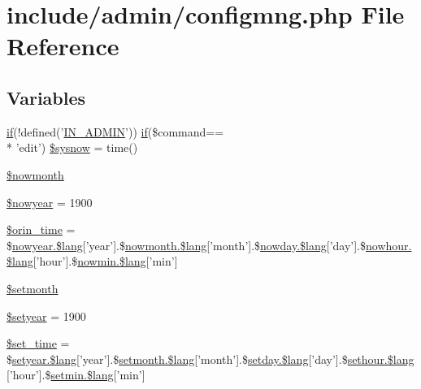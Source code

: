 \hypertarget{configmng_8php}{\section{include/admin/configmng.php File Reference}
\label{configmng_8php}
}
\subsection*{Variables}
\begin{DoxyCompactItemize}
\item 
\hyperlink{login__old_8php_a4ac1118c2e44c513a674bc1793ba6c90}{if}(!defined('\hyperlink{admin_8php_ad49472b0cdee543164375bf133a537f1}{I\+N\+\_\+\+A\+D\+M\+I\+N}')) \hyperlink{login__old_8php_a4ac1118c2e44c513a674bc1793ba6c90}{if}(\$command== \\*
'edit') \hyperlink{configmng_8php_ac8e8c76dd2f202183e4a4d51f56afbfb}{\$sysnow} = time()
\item 
\hyperlink{configmng_8php_abec251fa3431224f4ef12bbe94f3cb00}{\$nowmonth}
\item 
\hyperlink{configmng_8php_abbdd318e2a9fe9ad5799b9e6170e9c89}{\$nowyear} = 1900
\item 
\hyperlink{configmng_8php_a08b80099c663582a6f171ae6340787cd}{\$orin\+\_\+time} = \$\hyperlink{templates_2install_2traditional__chinese__utf8_8lang_8php_a7714b111b644017933931ec69a154102}{nowyear.\$lang}\mbox{[}'year'\mbox{]}.\$\hyperlink{templates_2install_2traditional__chinese__utf8_8lang_8php_a7714b111b644017933931ec69a154102}{nowmonth.\$lang}\mbox{[}'month'\mbox{]}.\$\hyperlink{templates_2install_2traditional__chinese__utf8_8lang_8php_a7714b111b644017933931ec69a154102}{nowday.\$lang}\mbox{[}'day'\mbox{]}.\$\hyperlink{templates_2install_2traditional__chinese__utf8_8lang_8php_a7714b111b644017933931ec69a154102}{nowhour.\$lang}\mbox{[}'hour'\mbox{]}.\$\hyperlink{templates_2install_2traditional__chinese__utf8_8lang_8php_a7714b111b644017933931ec69a154102}{nowmin.\$lang}\mbox{[}'min'\mbox{]}
\item 
\hyperlink{configmng_8php_ad0fe74be5fde6d338d88cd0745d972ae}{\$setmonth}
\item 
\hyperlink{configmng_8php_ae3eb1622bafce3a8595259194b7ecb8d}{\$setyear} = 1900
\item 
\hyperlink{configmng_8php_a655ccb5ffe64589a8852070d977d18b4}{\$set\+\_\+time} = \$\hyperlink{templates_2install_2traditional__chinese__utf8_8lang_8php_a7714b111b644017933931ec69a154102}{setyear.\$lang}\mbox{[}'year'\mbox{]}.\$\hyperlink{templates_2install_2traditional__chinese__utf8_8lang_8php_a7714b111b644017933931ec69a154102}{setmonth.\$lang}\mbox{[}'month'\mbox{]}.\$\hyperlink{templates_2install_2traditional__chinese__utf8_8lang_8php_a7714b111b644017933931ec69a154102}{setday.\$lang}\mbox{[}'day'\mbox{]}.\$\hyperlink{templates_2install_2traditional__chinese__utf8_8lang_8php_a7714b111b644017933931ec69a154102}{sethour.\$lang}\mbox{[}'hour'\mbox{]}.\$\hyperlink{templates_2install_2traditional__chinese__utf8_8lang_8php_a7714b111b644017933931ec69a154102}{setmin.\$lang}\mbox{[}'min'\mbox{]}
\end{DoxyCompactItemize}


